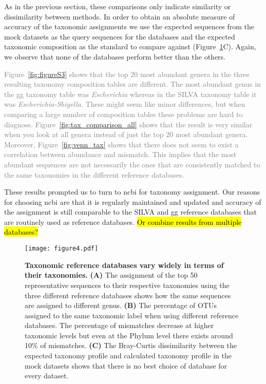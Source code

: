   As in the previous section, these comparisons only indicate similarity or dissimilarity between methods.
  In order to obtain an absolute measure of accuracy of the taxonomic assignments we use the expected sequences from the mock datasets as the query sequences for the databases and the expected taxonomic composition as the standard to compare against (Figure~\ref{fig:figure4}C).
  Again, we observe that none of the databases perform better than the others.

  \textcolor{gray}{
    Figure~\ref{fig:figureS3} shows that the top 20 most abundant genera in the three resulting taxonomy composition tables are different.
    The most abundant genus in the \ac{gg} taxonomy table was \textit{Escherichia} whereas in the SILVA taxonomy table it was \textit{Escherichia-Shigella}.
    These might seem like minor differences, but when comparing a large number of composition tables these problems are hard to diagnose.
    Figure~\ref{fig:tax_comparison_all} shows that the result is very similar when you look at all genera instead of just the top 20 most abundant genera.
    Moreover, Figure~\ref{fig:venn_tax} shows that there does not seem to exist a correlation between abundance and mismatch.
    This implies that the most abundant sequences are not necessarily the ones that are consistently matched to the same taxonomies in the different reference databases.
  }

  These results prompted us to turn to \ac{ncbi} for taxonomy assignment.
  Our reasons for choosing \ac{ncbi} are that it is regularly maintained and updated and accuracy of the assignment is still comparable to the SILVA and \ac{gg} reference databases that are routinely used as reference databases.
  \hl{Or combine results from multiple databases?}

  \begin{figure}[h]
    \centering
    \texttt{[image: figure4.pdf]}
    \caption{
      \textbf{Taxonomic reference databases vary widely in terms of their taxonomies.}
      \textbf{(A)} The assignment of the top 50 representative sequences to their respective taxonomies using the three different reference databases shows how the same sequences are assigned to different genus.
      \textbf{(B)} The percentage of \ac{OTU}s assigned to the same taxonomic label when using different reference databases.
      The percentage of mismatches decrease at higher taxonomic levels but even at the Phylum level there exists around 10\% of mismatches.
      \textbf{(C)} The Bray-Curtis dissimilarity between the expected taxonomy profile and calculated taxonomy profile in the mock datasets shows that there is no best choice of database for every dataset.
    }
    \label{fig:figure4}
  \end{figure}

